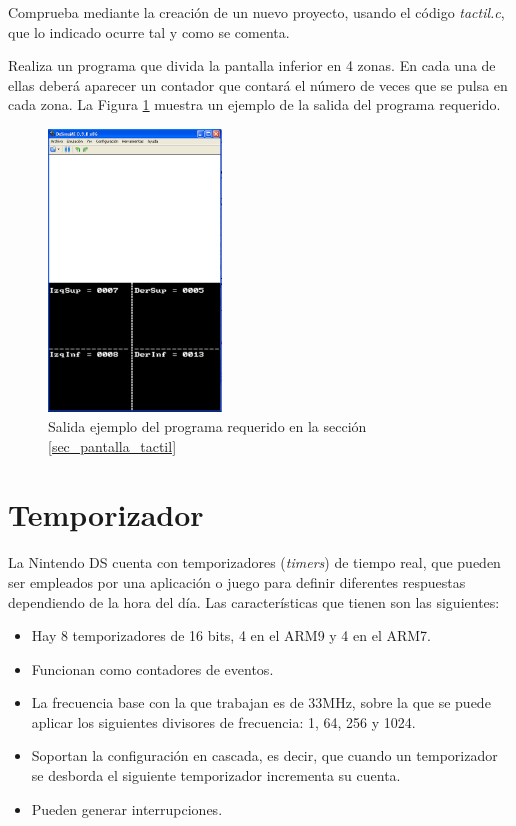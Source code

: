 \begin{exercise}
	Comprueba mediante la creación de un nuevo proyecto, usando el código \textit{tactil.c}, que lo indicado ocurre tal y como se comenta.
\end{exercise}

\begin{exercise}
Realiza un programa que divida la pantalla inferior en 4 zonas. En cada una de ellas deberá aparecer un contador que contará el número de veces que se pulsa en cada zona. La Figura \ref{fig_p3_c3_4zonas} muestra un ejemplo de la salida del programa requerido.
\end{exercise}

\begin{figure}[t]
\centering
\includegraphics[height=7.5cm]{Figuras/C3/c3_tactil1.png}
\caption{Salida ejemplo del programa requerido en la sección \ref{sec_pantalla_tactil}}
\label{fig_p3_c3_4zonas}
\end{figure}

\section{Temporizador}
La Nintendo DS cuenta con temporizadores (\textit{timers}) de tiempo real, que pueden ser empleados por una aplicación o juego para definir diferentes respuestas dependiendo de la hora del día. Las características que tienen son las siguientes:

\begin{itemize}
	\item Hay 8 temporizadores de 16 bits, 4 en el ARM9 y 4 en el ARM7.
	\item Funcionan como contadores de eventos.
	\item La frecuencia base con la que trabajan es de 33MHz, sobre la que se puede aplicar los siguientes divisores de frecuencia: 1, 64, 256 y 1024.
	\item Soportan la configuración en cascada, es decir, que cuando un temporizador se desborda el si\-guien\-te temporizador incrementa su cuenta.
	\item Pueden generar interrupciones. 
\end{itemize}

